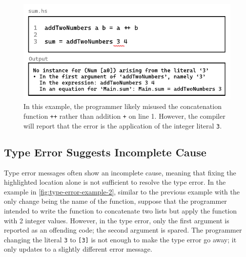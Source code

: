  \begin{figure}[hbt]
  \includegraphics[width=\linewidth]{TypeErrorExample}
  \caption{
    \label{fig:type-error-example}
  In this example, the programmer likely misused the concatenation function \texttt{++} rather than addition \texttt{+} on line 1. However, the compiler will report that the error is the application of the integer literal \texttt{3}.
    }
\end{figure}


\subsection{Type Error Suggests Incomplete Cause}
\label{subsec:imcomplete}

Type error messages often show an incomplete cause, meaning that fixing the highlighted location alone is not sufficient to resolve the type error. In the example in \ref{fig:type-error-example-2}, similar to the previous example with the only change being the name of the function, suppose that the programmer intended to write the function to concatenate two lists but apply the function with 2 integer values. However, in the type error, only the first argument is reported as an offending code; the second argument is spared. The programmer changing the literal \texttt{3} to \texttt{[3]} is not enough to make the type error go away; it only updates to a slightly different error message. 


